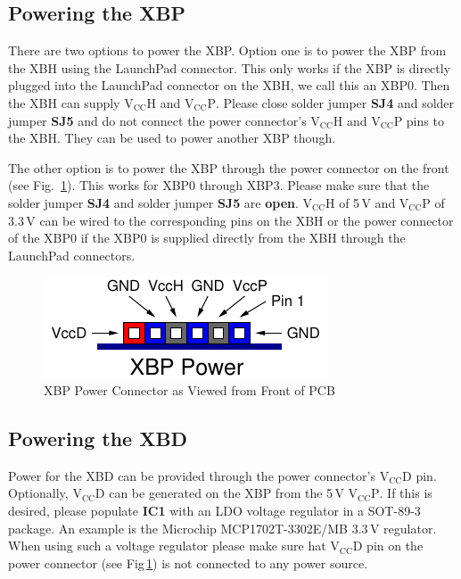 \documentclass[twoside,11pt]{cergdoc}
\begin{document}
\subsection{Powering the XBP}
There are two options to power the XBP. Option one is to power the XBP from the
XBH using the LaunchPad connector. This only works if the XBP is directly plugged into the 
LaunchPad connector on the XBH, 
we call this an XBP0. Then the XBH can supply $\mathrm{V_{CC}H}$ and $\mathrm{V_{CC}P}$.
Please close solder jumper \textbf{SJ4} and solder jumper \textbf{SJ5} and do not connect
the power connector's $\mathrm{V_{CC}H}$ and $\mathrm{V_{CC}P}$ pins to the XBH. 
They can be used to power another XBP though.

The other option is to power the XBP through the power connector on the front 
(see Fig.~\ref{fig:power}). This works for XBP0 through XBP3. Please make sure that the
solder jumper \textbf{SJ4} and solder jumper \textbf{SJ5} are \textbf{open}. 
$\mathrm{V_{CC}H}$ of 5\,V and $\mathrm{V_{CC}P}$ of 3.3\,V can be wired to the 
corresponding pins on the XBH or the power connector of the XBP0 if the XBP0 is supplied directly from the
XBH through the LaunchPad connectors.


\begin{figure}[ht]
  \begin{center}
    \includegraphics[scale=1]{figures/xbp_power}
    \caption{XBP Power Connector as Viewed from Front of PCB}\label{fig:power}
  \end{center}
\vspace{-1ex}
\end{figure}

\subsection{Powering the XBD}\label{sec:vccd}
Power for the XBD can be provided through the power connector's $\mathrm{V_{CC}D}$ pin.
Optionally, $\mathrm{V_{CC}D}$ can be generated on the XBP from the 5\,V $\mathrm{V_{CC}P}$.
If this is desired, please populate \textbf{IC1} with an LDO voltage regulator in a 
SOT-89-3 package. An example is the Microchip MCP1702T-3302E/MB 3.3\,V regulator.
When using such a voltage
regulator please make sure hat $\mathrm{V_{CC}D}$ pin on the power connector 
(see Fig\,\ref{fig:power}) is not connected to any power source.
\end{document}
